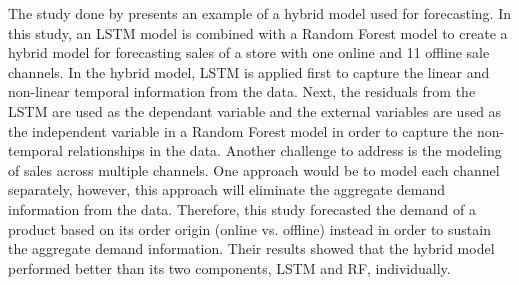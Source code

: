 The study done by \cite{c8} presents an example of a hybrid model used for forecasting. 
In this study, an LSTM model is combined with a Random Forest model to create a hybrid model for forecasting sales of a store with one online and 11 offline sale channels.
In the hybrid model, LSTM is applied first to capture the linear and non-linear temporal information from the data. 
Next, the residuals from the LSTM are used as the dependant variable and the external variables are used as the independent variable in a Random Forest model in order to capture the non-temporal relationships in the data. 
Another challenge to address is the modeling of sales across multiple channels. 
One approach would be to model each channel separately, however, this approach will eliminate the aggregate demand information from the data. 
Therefore, this study forecasted the demand of a product based on its order origin (online vs. offline) instead in order to sustain the aggregate demand information.
Their results showed that the hybrid model performed better than its two components, LSTM and RF, individually. 